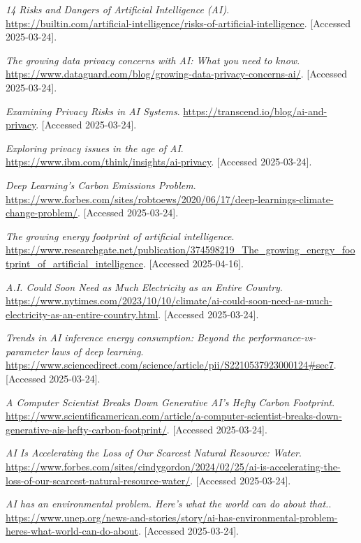 \documentclass[licencjacka,en]{pracamgr}
\begin{document}
\begin{thebibliography}{99}
\textit{ 14 Risks and Dangers of Artificial Intelligence (AI)}.
\url{https://builtin.com/artificial-intelligence/risks-of-artificial-intelligence}.
[Accessed 2025-03-24].

\textit{The growing data privacy concerns with AI: What you need to know}.
\url{https://www.dataguard.com/blog/growing-data-privacy-concerns-ai/}.
[Accessed 2025-03-24].

\textit{Examining Privacy Risks in AI Systems}.
\url{https://transcend.io/blog/ai-and-privacy}.
[Accessed 2025-03-24].

\textit{Exploring privacy issues in the age of AI}.
\url{https://www.ibm.com/think/insights/ai-privacy}.
[Accessed 2025-03-24].


\textit{Deep Learning’s Carbon Emissions Problem}.
\url{https://www.forbes.com/sites/robtoews/2020/06/17/deep-learnings-climate-change-problem/}.
[Accessed 2025-03-24].

\textit{The growing energy footprint of artificial intelligence}.
\url{https://www.researchgate.net/publication/374598219_The_growing_energy_footprint_of_artificial_intelligence}.
[Accessed 2025-04-16].

\textit{A.I. Could Soon Need as Much Electricity as an Entire Country}.
\url{https://www.nytimes.com/2023/10/10/climate/ai-could-soon-need-as-much-electricity-as-an-entire-country.html}.
[Accessed 2025-03-24].

\textit{Trends in AI inference energy consumption: Beyond the performance-vs-parameter laws of deep learning}.
\url{https://www.sciencedirect.com/science/article/pii/S2210537923000124#sec7}.
[Accessed 2025-03-24].

\textit{A Computer Scientist Breaks Down Generative AI’s Hefty Carbon Footprint}.
\url{https://www.scientificamerican.com/article/a-computer-scientist-breaks-down-generative-ais-hefty-carbon-footprint/}.
[Accessed 2025-03-24].

\textit{AI Is Accelerating the Loss of Our Scarcest Natural Resource: Water}.
\url{https://www.forbes.com/sites/cindygordon/2024/02/25/ai-is-accelerating-the-loss-of-our-scarcest-natural-resource-water/}.
[Accessed 2025-03-24].

\textit{AI has an environmental problem. Here’s what the world can do about that.}.
\url{https://www.unep.org/news-and-stories/story/ai-has-environmental-problem-heres-what-world-can-do-about}.
[Accessed 2025-03-24].


\end{thebibliography}
\end{document}
